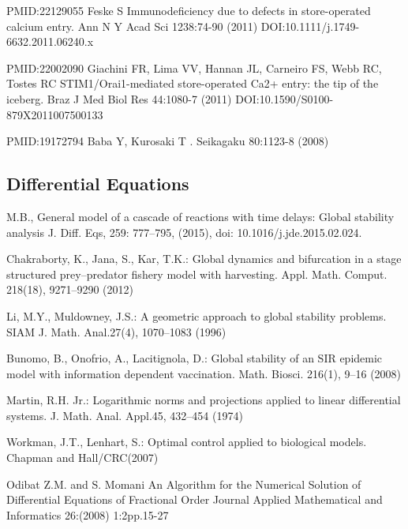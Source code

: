 \begin{thebibliography}{00}
PMID:22129055
 Feske S
\newblock Immunodeficiency due to defects in store-operated calcium entry.
\newblock Ann N Y Acad Sci 1238:74-90 (2011) DOI:10.1111/j.1749-6632.2011.06240.x

PMID:22002090
 Giachini FR, Lima VV, Hannan JL, Carneiro FS, Webb RC, Tostes RC
\newblock STIM1/Orai1-mediated store-operated Ca2+ entry: the tip of the iceberg.
\newblock Braz J Med Biol Res 44:1080-7 (2011) DOI:10.1590/S0100-879X2011007500133

PMID:19172794
 Baba Y, Kurosaki T
.
\newblock Seikagaku 80:1123-8 (2008)
\subsection{Differential Equations}

M.B., 
\newblock General model of a cascade of reactions with time delays: Global stability analysis
\newblock J. Diff. Eqs, 259: 777–795, (2015), doi: 10.1016/j.jde.2015.02.024.

Chakraborty, K., Jana, S., Kar, T.K.: 
\newblock Global dynamics and bifurcation in a stage structured prey–predator fishery model with harvesting. 
\newblock Appl. Math. Comput. 218(18), 9271–9290 (2012)

Li, M.Y., Muldowney, J.S.: 
\newblock A geometric approach to global stability problems. 
\newblock SIAM J. Math. Anal.27(4), 1070–1083 (1996)

Bunomo, B., Onofrio, A., Lacitignola, D.: 
\newblock Global stability of an SIR epidemic model with information dependent vaccination. 
\newblock Math. Biosci. 216(1), 9–16 (2008)

Martin,   R.H.   Jr.:   
\newblock Logarithmic   norms   and   projections   applied   to   linear   differential   systems.
\newblock J. Math. Anal. Appl.45, 432–454 (1974)

Workman,  J.T.,  Lenhart,  S.:  
\newblock Optimal  control  applied  to  biological  models.  
\newblock Chapman  and  Hall/CRC(2007)

 Odibat Z.M. and S. Momani
\newblock An Algorithm for the Numerical Solution of Differential Equations of Fractional Order
\newblock Journal Applied Mathematical and Informatics 26:(2008) 1:2pp.15-27


\end{thebibliography}
